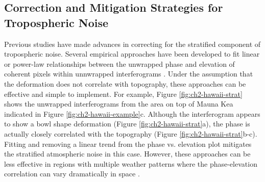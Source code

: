

\subsection{Correction and Mitigation Strategies for Tropospheric Noise}
\label{sec:ch2-noise-tropo-mitigate}





Previous studies have made advances in correcting for the stratified component of tropospheric noise.  Several empirical approaches have been developed to fit linear or power-law relationships between the unwrapped phase and elevation of coherent pixels within unnwrapped interferograms \citep{Elliott2008InsarSlipRate, Lauknes2011InsarTroposphericStratification, Bekaert2015SpatiallyVariablePower, Zebker2021AccuracyModelFree, Murray2021ClusterBasedEmpirical}. Under the assumption that the deformation does not correlate with topography, these approaches can be effective and simple to implement. For example, Figure \ref{fig:ch2-hawaii-strat} shows the unwrapped interferograms from the area on top of Mauna Kea indicated in Figure \ref{fig:ch2-hawaii-example}c. Although the interferogram appears to show a bowl shape deformation (Figure \ref{fig:ch2-hawaii-strat}a), the phase is actually closely correlated with the topography (Figure \ref{fig:ch2-hawaii-strat}b-c). Fitting and removing a linear trend from the phase vs. elevation plot mitigates the stratified atmospheric noise in this case. However, these approaches can be less effective in regions with multiple weather patterns where the phase-elevation correlation can vary dramatically in space \cite{Murray2021ClusterBasedEmpirical}.


